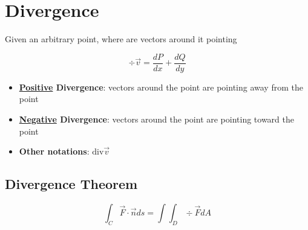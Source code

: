 \section{Divergence}

  Given an arbitrary point, where are vectors around it pointing

  \begin{equation}
    \div \vec{v} = \frac{dP}{dx} + \frac{dQ}{dy}
  \end{equation}

  \begin{itemize}
    \item \textbf{\ul{Positive} Divergence}: vectors around the point are
    pointing away from the point
    \item \textbf{\ul{Negative} Divergence}: vectors around the point are
    pointing toward the point
    \item \textbf{Other notations}: $ \text{div} \vec{v} $
  \end{itemize}

  \subsection{Divergence Theorem}

    \begin{equation}
      \int_{C} \vec{F} \cdot \vec{n} ds = \int \int_{D} \div \vec{F} dA
    \end{equation}